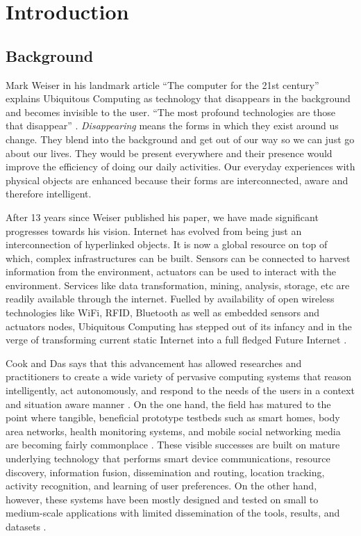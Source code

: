 \chapter{Introduction}

\section{Background}

Mark Weiser in his landmark article ``The computer for the 21st century'' \cite{Weiser1991} explains Ubiquitous Computing as technology that disappears in the background and becomes invisible to the user. ``The most profound technologies are those that disappear'' \cite{Weiser1991}. \emph{Disappearing} means the forms in which they exist around us change. They blend into the background and get out of our way so we can just go about our lives. They would be present everywhere and their presence would improve the efficiency of doing our daily activities. Our everyday experiences with physical objects are enhanced because their forms are interconnected, aware and therefore intelligent.

After 13 years since Weiser published his paper, we have made significant progresses towards his vision. Internet has evolved from being just an interconnection of hyperlinked objects. It is now a global resource on top of which, complex infrastructures can be built. Sensors can be connected to harvest information from the environment, actuators can be used to interact with the environment. Services like data transformation, mining, analysis, storage, etc are readily available through the internet. Fuelled by availability of open wireless technologies like WiFi, RFID, Bluetooth as well as embedded sensors and actuators nodes, Ubiquitous Computing has stepped out of its infancy and in the verge of transforming current static Internet into a full fledged Future Internet \cite{Gubbi2013}.

Cook and Das says that this advancement has allowed researches and practitioners to create a wide variety of pervasive computing systems that reason intelligently, act autonomously, and respond to the needs of the users in a context and situation aware manner \cite{Cook2012}. On the one hand, the field has matured to the point where tangible, beneficial prototype testbeds such as smart homes, body area networks, health monitoring systems, and mobile social networking media are becoming fairly commonplace \cite{Cook2012}. These visible successes are built on mature underlying technology that performs smart device communications, resource discovery, information fusion, dissemination and routing, location tracking, activity recognition, and learning of user preferences. On the other hand, however, these systems have been mostly designed and tested on small to medium-scale applications with limited dissemination of the tools, results, and datasets \cite{Cook2012}.

